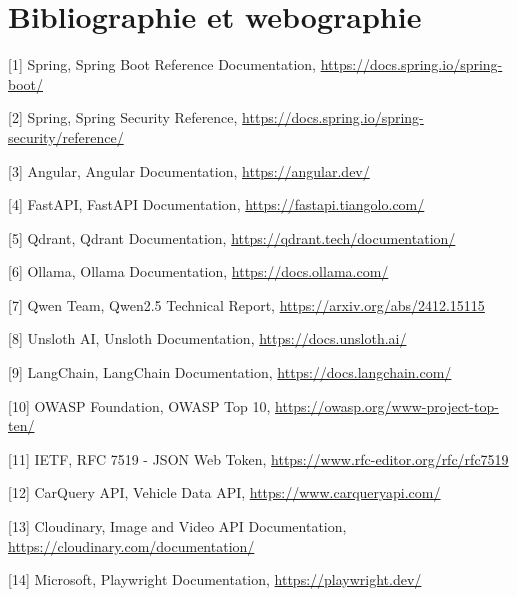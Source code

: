\chapter*{Bibliographie et webographie}

[1] Spring, Spring Boot Reference Documentation, \url{https://docs.spring.io/spring-boot/}


[2] Spring, Spring Security Reference, \url{https://docs.spring.io/spring-security/reference/}


[3] Angular, Angular Documentation, \url{https://angular.dev/}


[4] FastAPI, FastAPI Documentation, \url{https://fastapi.tiangolo.com/}


[5] Qdrant, Qdrant Documentation, \url{https://qdrant.tech/documentation/}


[6] Ollama, Ollama Documentation, \url{https://docs.ollama.com/}


[7] Qwen Team, Qwen2.5 Technical Report, \url{https://arxiv.org/abs/2412.15115}


[8] Unsloth AI, Unsloth Documentation, \url{https://docs.unsloth.ai/}


[9] LangChain, LangChain Documentation, \url{https://docs.langchain.com/}


[10] OWASP Foundation, OWASP Top 10, \url{https://owasp.org/www-project-top-ten/}


[11] IETF, RFC 7519 - JSON Web Token, \url{https://www.rfc-editor.org/rfc/rfc7519}


[12] CarQuery API, Vehicle Data API, \url{https://www.carqueryapi.com/}


[13] Cloudinary, Image and Video API Documentation, \url{https://cloudinary.com/documentation/}


[14] Microsoft, Playwright Documentation, \url{https://playwright.dev/}
